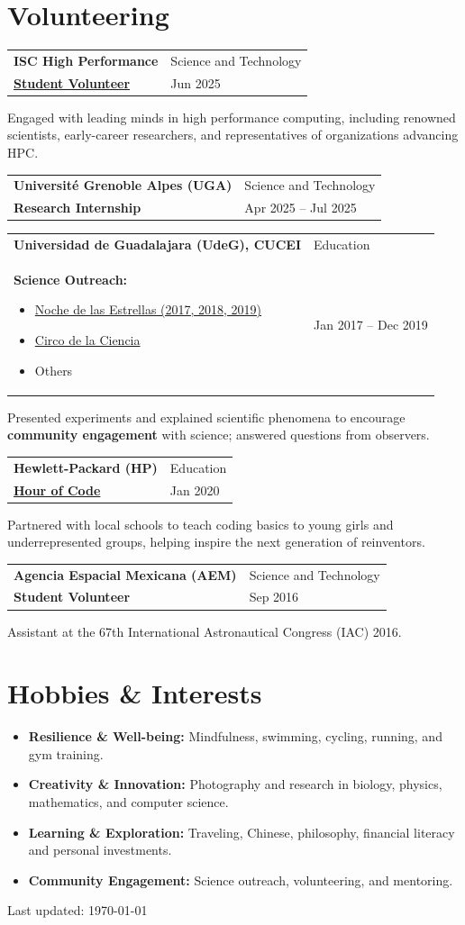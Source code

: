 \documentclass[10pt,a4paper]{article}
\makeatletter
\newenvironment{cvbullets}{
  \begin{itemize}[
        leftmargin=1.2em,
        label=\textcolor{accent}{\footnotesize\textbullet},
        itemsep=1.5pt,
        topsep=2pt,
        parsep=0pt,
        partopsep=0pt
      ]
    }{
  \end{itemize}
}
\newcommand{\cventry}[4]{%
  \vspace{2pt}%
  \begin{tabularx}{\textwidth}{@{}X>{\raggedleft\arraybackslash}p{1.55in}@{}}
    {\bfseries\color{ink}#1} & {\small\color{muted}#3}\\[-1pt]
    {\bfseries\color{accent}#2} & {\small\color{muted}#4}
  \end{tabularx}%
  \vspace{-1pt}%
}
\makeatother
\begin{document}
\newpage
\section*{Volunteering}
\cventry{ISC High Performance}
{\href{https://isc-hpc.com/program/student-volunteer-program/}{Student
Volunteer}}{Science and Technology}{Jun 2025}
Engaged with leading minds in high performance computing, including renowned
scientists, early-career researchers, and representatives of organizations
advancing HPC.

\cventry{Université Grenoble Alpes (UGA)}{Research Internship}
{Science and Technology}{Apr 2025 -- Jul 2025}

\cventry{Universidad de Guadalajara (UdeG), CUCEI}{Science Outreach:
  \begin{cvbullets}
  \item \href{https://www.facebook.com/ndejalisco}{Noche de las Estrellas
    (2017, 2018, 2019)}
  \item \href{https://www.facebook.com/circodelaciencia/}{Circo de la Ciencia}
  \item Others
\end{cvbullets}}{Education}{Jan 2017 -- Dec 2019}
Presented experiments and explained scientific phenomena to encourage
\textbf{community engagement} with science; answered questions from observers.

\cventry{Hewlett-Packard (HP)}
{\href{https://www.linkedin.com/posts/hp_hpproud-activity-6625803861640695808-o5_E}{Hour
of Code}}{Education}{Jan 2020}
Partnered with local schools to teach coding basics to young girls
and underrepresented groups, helping inspire the next generation of
reinventors.

\cventry{Agencia Espacial Mexicana (AEM)}{Student Volunteer}{Science and
Technology}{Sep 2016}
Assistant at the 67th International Astronautical Congress (IAC) 2016.

\section*{Hobbies \& Interests}
\begin{cvbullets}
\item \textbf{Resilience \& Well-being:} Mindfulness, swimming, cycling,
  running, and gym training.
\item \textbf{Creativity \& Innovation:} Photography and research in biology,
  physics, mathematics, and computer science.
\item \textbf{Learning \& Exploration:} Traveling, Chinese, philosophy,
  financial literacy and personal investments.
\item \textbf{Community Engagement:} Science outreach, volunteering, and
  mentoring.
\end{cvbullets}

\vspace*{\fill}
\begin{center}
  \small\color{muted}Last updated: \today
\end{center}
\vspace*{\fill}
\end{document}
